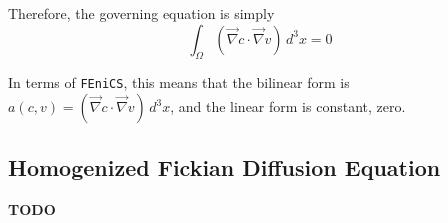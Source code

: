 \documentclass{article}
\begin{document}
Therefore, the governing equation is simply
$$\int_{\Omega} \left( \vec{\nabla}c \cdot \vec{\nabla}v \right) \,d^3x = 0$$

In terms of \texttt{FEniCS}, this means that the bilinear form is
$a(c,v)=\left( \vec{\nabla}c \cdot \vec{\nabla}v \right) \,d^3x$,
and the linear form is constant, zero.

\subsection{Homogenized Fickian Diffusion Equation}\label{subsec:hom_fick}

\textbf{TODO}
\end{document}
